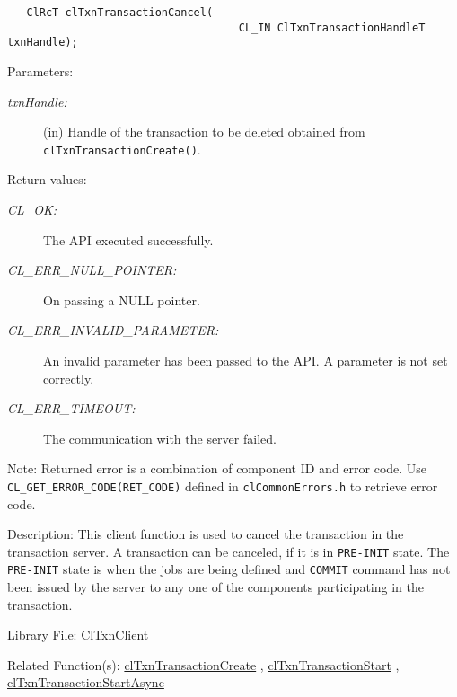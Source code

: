 \begin{flushleft}
\begin{Desc}
\footnotesize\begin{verbatim}   ClRcT clTxnTransactionCancel(
                               		CL_IN ClTxnTransactionHandleT txnHandle);
\end{verbatim}
\normalsize
\end{Desc}
\begin{Desc}
\item[Parameters:]
\begin{description}
\item[{\em txn\-Handle:}](in) Handle of the transaction to be deleted obtained from {\tt{clTxnTransactionCreate()}}.\end{description}
\end{Desc}
\begin{Desc}
\item[Return values:]
\begin{description}
\item[{\em CL\_\-OK:}]The API executed successfully. 
\item[{\em CL\_\-ERR\_\-NULL\_\-POINTER:}]On passing a NULL pointer. 
\item[{\em CL\_\-ERR\_\-INVALID\_\-PARAMETER:}]An invalid parameter has been passed to the API. A parameter is not set correctly. 
\item[{\em CL\_\-ERR\_\-TIMEOUT:}]The communication with the server failed.\end{description}
\end{Desc}
\begin{Desc}
\item[Note:]Returned error is a combination of component ID and error code. Use {\tt{CL\_\-GET\_\-ERROR\_\-CODE(RET\_\-CODE)}} defined in
{\tt{clCommonErrors.h}} to retrieve error code.\end{Desc}
\begin{Desc}
\item[Description:]This client function is used to cancel the transaction in the transaction server. A transaction can be canceled, if it is in 
{\tt{PRE-INIT}} state. The {\tt{PRE-INIT}} state is when the jobs are being defined and {\tt{COMMIT}} command has not been issued by the server to any one
of the components participating in the transaction.\end{Desc}
\begin{Desc}
\item[Library File:]Cl\-Txn\-Client\end{Desc}
\begin{Desc}
\item[Related Function(s):]\hyperlink{pagetxn103}{cl\-Txn\-Transaction\-Create} , \hyperlink{pagetxn105}{cl\-Txn\-Transaction\-Start} , 
\hyperlink{pagetxn106}{cl\-Txn\-Transaction\-Start\-Async} \end{Desc}
\newpage



\end{flushleft}
